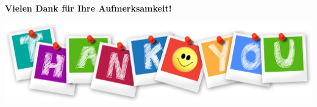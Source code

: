 \miniframesoff
\section{}

{
\Large
\begin{frame}%
    \textbf{Vielen Dank für Ihre Aufmerksamkeit!}
    \medskip

    \includegraphics[keepaspectratio, width=.75\textwidth]{include/thank-you.png}
\end{frame}
}

\miniframeson
